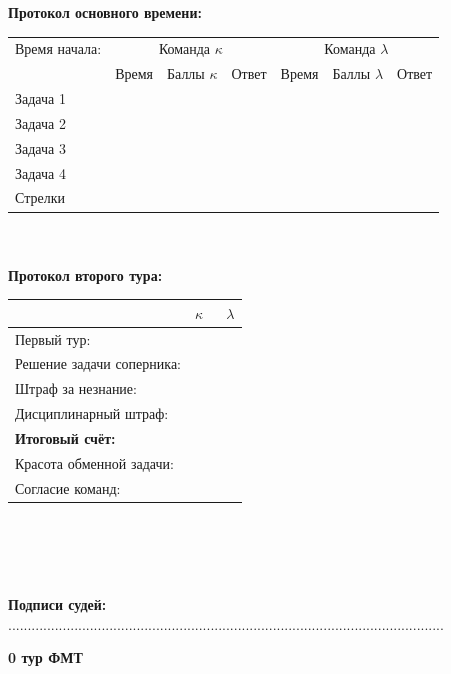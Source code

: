 \documentclass[12pt]{article}
\begin{document}
\begin{center}{\bf Протокол основного времени: } \\ 
\begin{tabular}{|p{3.3cm}|p{1.5cm}|p{2cm}|p{1.5cm}|p{1.5cm}|p{2cm}|p{1.5cm}|}
\hline Время начала: & \multicolumn{3}{c|}{Команда $\kappa$} & \multicolumn{3}{c|}{Команда $\lambda$ }\\\cline{2-7} {} & Время & Баллы $\kappa$ & Ответ & Время & Баллы $\lambda$ & Ответ \\\hline \hline \center Задача 1 &{}&{}&{}&{}&{}&{}\\[20mm]\hline \hline \center Задача 2 &{}&{}&{}&{}&{}&{}\\[20mm]\hline \hline \center Задача 3 &{}&{}&{}&{}&{}&{}\\[20mm]\hline \hline \center Задача 4 &{}&{}&{}&{}&{}&{}\\[20mm]\hline \hline \center Стрелки &{}&{}&{}&{}&{}&{}\\[20mm]\hline
\end{tabular}
$ $\\
$ $\\
{\bf Протокол второго тура: } \\ 
\begin{tabular}{ | p{7cm} | p{1cm} | p{1cm} |}
\hline
$ $ & \centering $\kappa$ & $\;$ $\lambda$ \\ \hline\raggedleft Первый тур: & & \\ \hline\raggedleft Решение задачи соперника: & & \\ \hline\raggedleft Штраф за незнание: & & \\ \hline\raggedleft Дисциплинарный штраф: & & \\ \hline\raggedleft \bf Итоговый счёт: & & \\ \hline \hline\raggedleft Красота обменной задачи: & & \\ \hline\raggedleft Согласие команд: & & \\ \hline\end{tabular}\end{center}
$ $\\
$ $\\
$ $\\
$ $\\
{\bf Подписи судей: }................................................................................................................\newpage
\begin{center}
{\Huge \bf 0 тур ФМТ}
\end{center}
\end{document}
